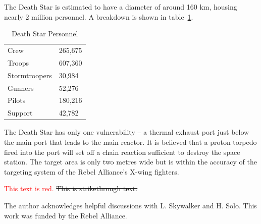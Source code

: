 \documentclass[aps,prb,twocolumn,groupedaddress,10pt,longbibliography,nofootinbib]{revtex4-2}
\begin{document}
The Death Star is estimated to have a diameter of around 160 km, housing nearly 2 million personnel. A breakdown is shown in table~\ref{table:forces}.
\begin{table}%
\begin{tabular}{|l|l|}
\hline
Crew & 265,675 \\
Troops & 607,360\\
Stormtroopers & 30,984\\
Gunners & 52,276\\
Pilots & 180,216\\
Support & 42,782\\
\hline
\end{tabular}
\caption{Death Star Personnel}
\label{table:forces}
\end{table}

The Death Star has only one vulnerability -- a thermal exhaust port just below the main port that leads to the main reactor. It is believed that a proton torpedo fired into the port will set off a chain reaction sufficient to destroy the space station. The target area is only two metres wide but is within the accuracy of the targeting system of the Rebel Alliance's X-wing fighters.

\textcolor{red}{This text is red.}
\sout{This is strikethrough text.}

\begin{acknowledgments}
The author acknowledges helpful discussions with L. Skywalker and H. Solo. This work was funded by the Rebel Alliance.
\end{acknowledgments}




\end{document}
